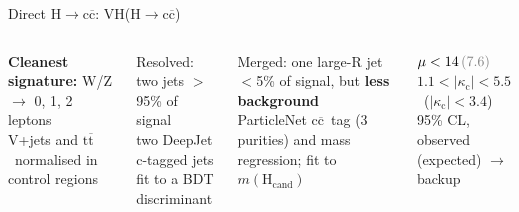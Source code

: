 \documentclass[aspectratio=169,10pt,xcolor=table]{beamer}
\newcommand{\qbar}[1]{\mathrm{#1}\overline{\mathrm{#1}}}
\newcommand{\ccbar}{\ensuremath{\qbar{c}}}
\newcommand{\kc}{\ensuremath{\kappa_\mathrm{c}}}
\newcommand{\Hcc}{\ensuremath{\mathrm{H}\to\qbar{c}}}
\newcommand{\ttbar}{\ensuremath{\qbar{t}}}
\newcommand{\obsexp}[2]{#1\,{\color{gray}(#2)}}
\newcommand{\tobackup}{{\scriptsize\color{gray}$\to$ backup}}
\newcommand{\pubHIG}[1]{https://cms-results.web.cern.ch/cms-results/public-results/publications/#1/}
\newcommand{\pubref}[1]{\gdef\thepubref{#1}}
\gdef\thepubref{}
\newcommand{\up}{\vspace*{-0.8em}}
\begin{document}
\pubref{\href{\pubHIG{HIG-21-008}}{PRL 131 (2023) 061801, CMS-HIG-21-008}}
\begin{frame}[t]{Direct \Hcc: VH(\Hcc)}
  \up
  \begin{columns}[T]
    \begin{keybox}
      \textbf{Cleanest signature:} W/Z $\to$ 0, 1, 2 leptons\\
      V+jets and \ttbar\ normalised in control regions\par\vspace{3pt}
      {\centering{}\enspace{}\enspace{}\par}
    \end{keybox}
    \vspace{2pt}
    {\centering{}\par}
    \par\vspace{9pt}
    \begin{minipage}[t]{0.49\linewidth}
      \begin{outbox}[equal height group=vh]{Resolved: two jets}
        $>$95\% of signal\\
        two DeepJet c-tagged jets\\
        fit to a BDT discriminant
      \end{outbox}
    \end{minipage}\hfill
    \begin{minipage}[t]{0.49\linewidth}
      \begin{outbox}[equal height group=vh]{Merged: one large-R jet}
        $<$5\% of signal, but \textbf{less background}\\
        ParticleNet \ccbar\ tag (3 purities) and mass regression; fit to $m(\mathrm{H_{cand}})$
      \end{outbox}
    \end{minipage}\par\vspace{6pt}
    \begin{resultbox}
      $\mu < \obsexp{14}{7.6}$\qquad $1.1 < |\kc| < 5.5$\ {\color{gray}($|\kc|<3.4$)}\\[-1pt]
      {\scriptsize\color{gray}95\% CL, observed (expected) \tobackup}
    \end{resultbox}


\end{columns}
\end{frame}
\end{document}
